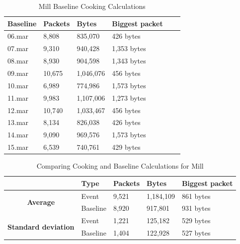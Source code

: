 \begin{table}[H]
    \centering
    \caption{Mill Baseline Cooking Calculations}
    \begin{tabular}{|l|l|l|l|l|l|}
    \hline
        \textbf{Baseline} & \textbf{Packets} & \textbf{Bytes} & \textbf{Biggest packet} \\ \hline
        06.mar & 8,808  & 835,070   & 426 bytes \\ \hline
        07.mar & 9,310  & 940,428   & 1,353 bytes \\ \hline
        08.mar & 8,930  & 904,598   & 1,343 bytes \\ \hline
        09.mar & 10,675 & 1,046,076 & 456 bytes \\ \hline
        10.mar & 6,989  & 774,986   & 1,573 bytes \\ \hline
        11.mar & 9,983  & 1,107,006 & 1,273 bytes \\ \hline
        12.mar & 10,740 & 1,033,467 & 456 bytes \\ \hline
        13.mar & 8,134  & 826,038   & 426 bytes \\ \hline
        14.mar & 9,090  & 969,576   & 1,573 bytes \\ \hline
        15.mar & 6,539  & 740,761   & 429 bytes \\ \hline
    \end{tabular}
    \label{tab:MillBaselineCookingCalculations}
\end{table}

\begin{table}[H]
    \centering
    \caption{Comparing Cooking and Baseline Calculations for Mill}
    \begin{tabular}{c|l|l|l|l|}
        \cline{2-5}
        \multicolumn{1}{l|}{}                                              & \textbf{Type} & \textbf{Packets} & \textbf{Bytes} & \textbf{Biggest packet} \\ \hline
        \multicolumn{1}{|c|}{\multirow{2}{*}{\textbf{Average}}}            & Event         & 9,521              & 1,184,109       & 861 bytes               \\ \cline{2-5} 
        \multicolumn{1}{|c|}{}                                             & Baseline      & 8,920              & 917,801         & 931 bytes                \\ \hline
        \multicolumn{1}{|c|}{\multirow{2}{*}{\textbf{Standard deviation}}} & Event         & 1,221              & 125,182         & 529 bytes                 \\ \cline{2-5} 
        \multicolumn{1}{|c|}{}                                             & Baseline      & 1,404               & 122,928       &  527 bytes               \\ \hline          
    \end{tabular}
    \label{tab:MillComparingBaselineAndCookingCalculations}
\end{table}

